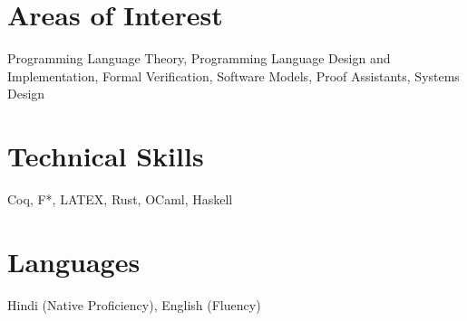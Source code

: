 \documentclass{moderncv}
\begin{document}
\section{Areas of Interest}
\label{sec:orgefb0035}
Programming Language Theory, Programming Language Design and Implementation, Formal Verification, Software Models, Proof Assistants, Systems Design
\section{Technical Skills}
\label{sec:org0162989}
Coq, F*, LATEX, Rust, OCaml, Haskell
\section{Languages}
\label{sec:org411924d}
Hindi (Native Proficiency), English (Fluency)
\end{document}
